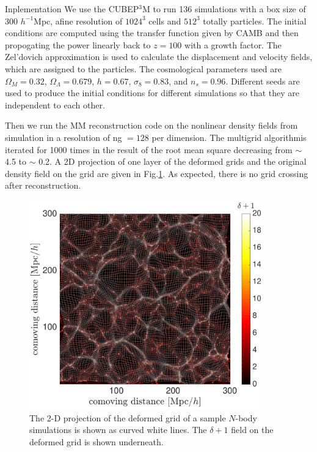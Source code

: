\begin{section}{Inplementation}
  \label{sec:simulation}
We use the \textsc{CUBEP$^3$M} \cite{bib:Harnois2013} to 
run 136 simulations with a box size of 300 $h^{-1}$Mpc, 
afine resolution of $1024^3$ cells and $512^3$ totally particles. 
The initial conditions are computed using the transfer function 
given by CAMB \cite{bib:Lewis2000} and then propogating the power 
linearly back to $z=100$ with a growth factor. 
The Zel'dovich approximation is used to calculate the displacement 
and velocity fields, which are assigned to the particles. 
The cosmological parameters used are $\Omega_M=0.32$, 
$\Omega_{\Lambda}=0.679$, $h=0.67$, $\sigma_8=0.83$, and $n_s=0.96$. 
Different seeds are used to produce the initial conditions for 
different simulations so that they are 
independent to each other.

Then we run the MM reconstruction code on the nonlinear density fields
from simulation in a resolution of ng $=128$ per dimension. The multigrid 
algorithmis iterated for 1000 times in the result of the root mean 
square decreasing from $\sim$ 4.5 to $\sim$ 0.2.
A 2D projection of one layer of the deformed grids and the
original density field on the grid are given in Fig.\ref{fig:simandrec}.
As expected, there is no grid crossing after reconstruction.


\begin{figure}[t!]
\centering
 \includegraphics[width=0.9\textwidth]{fig1.pdf}
   \caption{
The 2-D projection of the deformed grid of a sample $N$-body simulations 
is shown as curved white lines. The $\delta+1$ field on the deformed 
grid is shown underneath.}
 \label{fig:simandrec}
\end{figure}

\end{section}

